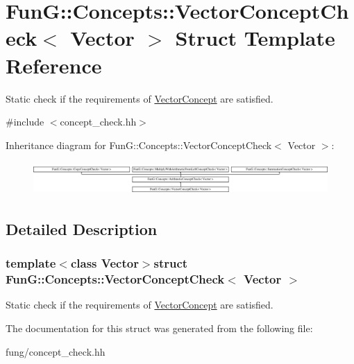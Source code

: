 \hypertarget{structFunG_1_1Concepts_1_1VectorConceptCheck}{\section{Fun\-G\-:\-:Concepts\-:\-:Vector\-Concept\-Check$<$ Vector $>$ Struct Template Reference}
\label{structFunG_1_1Concepts_1_1VectorConceptCheck}
}


Static check if the requirements of \hyperlink{structFunG_1_1Concepts_1_1VectorConcept}{Vector\-Concept} are satisfied.  




{\ttfamily \#include $<$concept\-\_\-check.\-hh$>$}

Inheritance diagram for Fun\-G\-:\-:Concepts\-:\-:Vector\-Concept\-Check$<$ Vector $>$\-:\begin{figure}[H]
\begin{center}
\leavevmode
\includegraphics[height=1.287356cm]{structFunG_1_1Concepts_1_1VectorConceptCheck}
\end{center}
\end{figure}


\subsection{Detailed Description}
\subsubsection*{template$<$class Vector$>$struct Fun\-G\-::\-Concepts\-::\-Vector\-Concept\-Check$<$ Vector $>$}

Static check if the requirements of \hyperlink{structFunG_1_1Concepts_1_1VectorConcept}{Vector\-Concept} are satisfied. 

The documentation for this struct was generated from the following file\-:\begin{DoxyCompactItemize}
\item 
fung/concept\-\_\-check.\-hh\end{DoxyCompactItemize}

